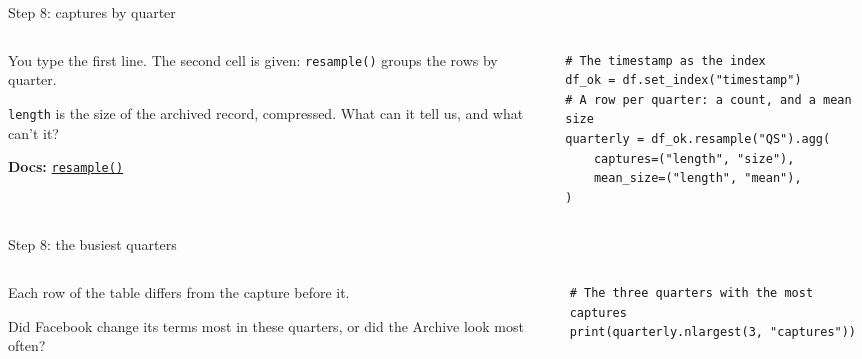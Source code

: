 \documentclass[9pt,aspectratio=169]{beamer}
\begin{document}
\begin{frame}[fragile]{Step 8: captures by quarter}
    \begin{columns}[T]
        \begin{column}{0.37\textwidth}
            You type the first line. The second cell is given: \texttt{resample()} groups the rows by quarter.

            \medskip
            \texttt{length} is the size of the archived record, compressed. What can it tell us, and what can't it?

            \medskip
            {\scriptsize\textbf{Docs:} \href{https://pandas.pydata.org/docs/reference/api/pandas.DataFrame.resample.html}{\texttt{resample()}}\par}
        \end{column}
        \begin{column}{0.6\textwidth}
\begin{lstlisting}
# The timestamp as the index
df_ok = df.set_index("timestamp")
# A row per quarter: a count, and a mean size
quarterly = df_ok.resample("QS").agg(
    captures=("length", "size"),
    mean_size=("length", "mean"),
)
\end{lstlisting}
        \end{column}
    \end{columns}
\end{frame}

\begin{frame}[fragile]{Step 8: the busiest quarters}
    \begin{columns}[T]
        \begin{column}{0.37\textwidth}
            Each row of the table differs from the capture before it.

            \medskip
            Did Facebook change its terms most in these quarters, or did the Archive look most often?
        \end{column}
        \begin{column}{0.6\textwidth}
\begin{lstlisting}
# The three quarters with the most captures
print(quarterly.nlargest(3, "captures"))
\end{lstlisting}
        \end{column}
    \end{columns}
\end{frame}
\end{document}
